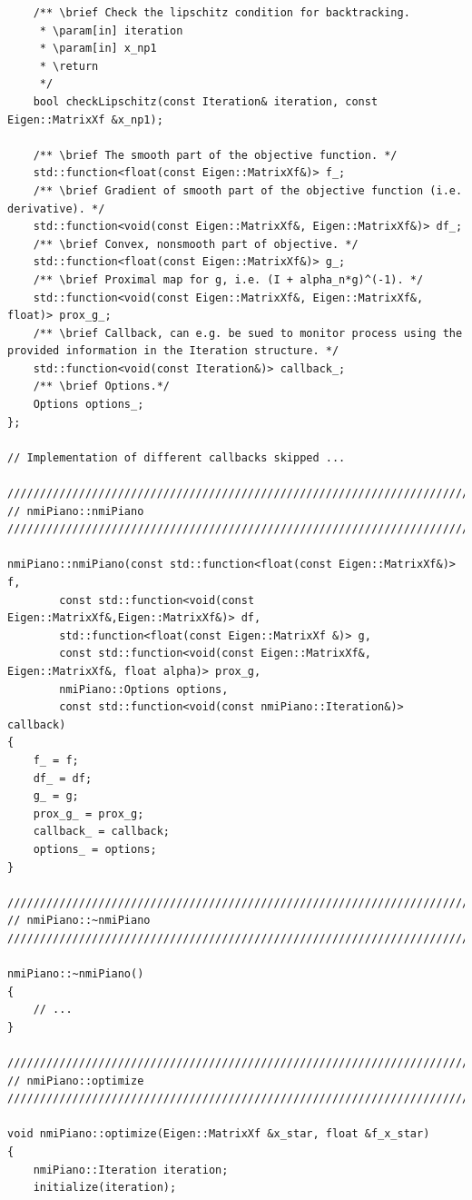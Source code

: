 \documentclass[onecolumn,final,a4paper,13pt,reqno]{siamart}
\begin{document}
\begin{appendix}
\begin{lstlisting}
    /** \brief Check the lipschitz condition for backtracking.
     * \param[in] iteration
     * \param[in] x_np1
     * \return
     */
    bool checkLipschitz(const Iteration& iteration, const Eigen::MatrixXf &x_np1);
    
    /** \brief The smooth part of the objective function. */
    std::function<float(const Eigen::MatrixXf&)> f_;
    /** \brief Gradient of smooth part of the objective function (i.e. derivative). */
    std::function<void(const Eigen::MatrixXf&, Eigen::MatrixXf&)> df_;
    /** \brief Convex, nonsmooth part of objective. */
    std::function<float(const Eigen::MatrixXf&)> g_;
    /** \brief Proximal map for g, i.e. (I + alpha_n*g)^(-1). */
    std::function<void(const Eigen::MatrixXf&, Eigen::MatrixXf&, float)> prox_g_;
    /** \brief Callback, can e.g. be sued to monitor process using the provided information in the Iteration structure. */
    std::function<void(const Iteration&)> callback_;
    /** \brief Options.*/
    Options options_;
};

// Implementation of different callbacks skipped ...

////////////////////////////////////////////////////////////////////////////////
// nmiPiano::nmiPiano
////////////////////////////////////////////////////////////////////////////////

nmiPiano::nmiPiano(const std::function<float(const Eigen::MatrixXf&)> f, 
        const std::function<void(const Eigen::MatrixXf&,Eigen::MatrixXf&)> df, 
        std::function<float(const Eigen::MatrixXf &)> g,
        const std::function<void(const Eigen::MatrixXf&, Eigen::MatrixXf&, float alpha)> prox_g,
        nmiPiano::Options options,
        const std::function<void(const nmiPiano::Iteration&)> callback)
{
    f_ = f;
    df_ = df;
    g_ = g;
    prox_g_ = prox_g;
    callback_ = callback;
    options_ = options;
}

////////////////////////////////////////////////////////////////////////////////
// nmiPiano::~nmiPiano
////////////////////////////////////////////////////////////////////////////////

nmiPiano::~nmiPiano()
{
    // ...
}

////////////////////////////////////////////////////////////////////////////////
// nmiPiano::optimize
////////////////////////////////////////////////////////////////////////////////

void nmiPiano::optimize(Eigen::MatrixXf &x_star, float &f_x_star)
{
    nmiPiano::Iteration iteration;
    initialize(iteration);
    

\end{lstlisting}
\end{appendix}
\end{document}
